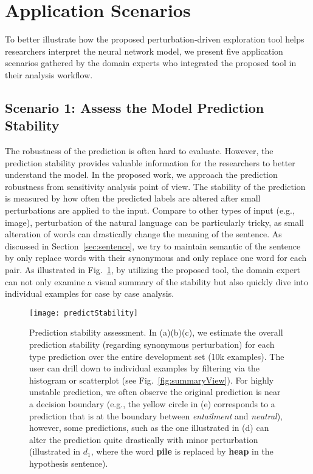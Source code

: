 \section{Application Scenarios}
\label{sec:caseStudy}
To better illustrate how the proposed perturbation-driven exploration tool helps researchers interpret the neural network model, we present five application scenarios gathered by the domain experts who integrated the proposed tool in their analysis workflow.

\subsection{Scenario 1: Assess the Model Prediction Stability}
The robustness of the prediction is often hard to evaluate. However, the prediction stability provides valuable information for the researchers to better understand the model.
%
In the proposed work, we approach the prediction robustness from sensitivity analysis point of view. The stability of the prediction is measured by how often the predicted labels are altered after small perturbations are applied to the input.
%
Compare to other types of input (e.g., image), perturbation of the natural language can be particularly tricky, as small alteration of words can drastically change the meaning of the sentence. As discussed in Section~\ref{sec:sentence}, we try to maintain semantic of the sentence by only replace words with their synonymous and only replace one word for each pair.
As illustrated in Fig.~\ref{fig:predictStability}, by utilizing the proposed tool, the domain expert can not only examine a visual summary of the stability but also quickly dive into individual examples for case by case analysis.

\begin{figure}[htbp]
\centering
\vspace{-2mm}
 \texttt{[image: predictStability]}
 \vspace{-4mm}
 \caption{
Prediction stability assessment. In (a)(b)(c), we estimate the overall prediction stability (regarding synonymous perturbation) for each type prediction over the entire development set (10k examples). The user can drill down to individual examples by filtering via the histogram or scatterplot (see Fig.~\ref{fig:summaryView}). For highly unstable prediction, we often observe the original prediction is near a decision boundary (e.g., the yellow circle in (e) corresponds to a prediction that is at the boundary between \emph{entailment} and \emph{neutral}), however, some predictions, such as the one illustrated in (d) can alter the prediction quite drastically with minor perturbation (illustrated in $d_1$, where the word \textbf{pile} is replaced by \textbf{heap} in the hypothesis sentence).
}
\label{fig:predictStability}
\vspace{-2mm}
\end{figure}

